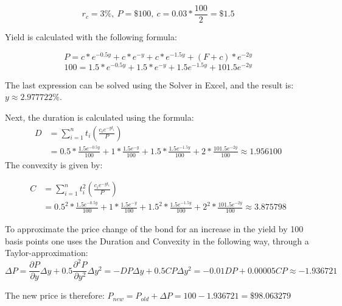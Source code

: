 \documentclass{article}
\begin{document}
$$r_c = 3\%, \ P = \$100, \ c = 0.03 * \frac{100}{2} = \$1.5$$

Yield is calculated with the following formula:

$$P = c * e^{-0.5y} + c*e^{-y} + c*e^{-1.5y} + (F+c)*e^{-2y}$$
$$100 = 1.5 * e^{-0.5y} + 1.5*e^{-y} + 1.5e^{-1.5y} + 101.5e^{-2y}$$

The last expression can be solved using the Solver in Excel, and the result is: $y \approx 2.977722 \%$.

Next, the duration is calculated using the formula:
\begin{align*}
	D &= \sum_{i=1}^n t_i \left(\frac{c_ie^{-yt_i}}{P}\right) \\
	&= 0.5 * \frac{1.5e^{-0.5y}}{100} + 1*\frac{1.5e^{-y}}{100} + 1.5 * \frac{1.5e^{-1.5y}}{100} + 2 * \frac{101.5e^{-2y}}{100} \approx 1.956100
\end{align*}
The convexity is given by:

\begin{align*}
	C &= \sum_{i=1}^n t_i^2 \left(\frac{c_ie^{-yt_i}}{P}\right) \\
	&= 0.5^2 * \frac{1.5e^{-0.5y}}{100} + 1*\frac{1.5e^{-y}}{100} + 1.5^2 * \frac{1.5e^{-1.5y}}{100} + 2^2 * \frac{101.5e^{-2y}}{100} \approx 3.875798
\end{align*}

To approximate the price change of the bond for an increase in the yield by 100 basis points one uses the Duration and Convexity in the following way, through a Taylor-approximation:
$$\Delta P = \frac{\partial P}{\partial y} \Delta y + 0.5 \frac{\partial^2 P}{\partial y^2} \Delta y^2 = -DP\Delta y + 0.5 CP \Delta y^2 = -0.01DP + 0.00005CP \approx -1.936721$$

The new price is therefore: $P_{new} = P_{old} + \Delta P = 100 -1.936721 = \$98.063279 $
\end{document}

